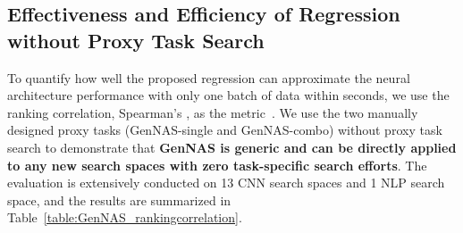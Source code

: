 \documentclass{article}
\begin{document}
\vspace{-10pt}
\subsection{Effectiveness and Efficiency of Regression without Proxy Task Search}
\label{sec:exp-regression}
\vspace{-4pt}




To quantify how well the proposed regression can approximate the neural architecture performance with only one batch of data within seconds, we use the ranking correlation, Spearman's , as the metric~\cite{abdelfattah2021zero, liu2020labels, zela2019understanding}.
We use the two manually designed proxy tasks (GenNAS-single and GenNAS-combo) without proxy task search to demonstrate that \textbf{GenNAS is generic and can be directly applied to any new search spaces with zero task-specific search efforts}.
The evaluation is extensively conducted on 13 CNN search spaces and 1 NLP search space, and the results are summarized in Table~\ref{table:GenNAS_rankingcorrelation}.
\end{document}
